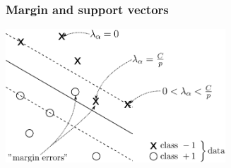 \begin{frame} \frametitle{Margin and support vectors}
	\begin{center} 
		\includegraphics[height=5cm]{img/section2_fig16_v2} 
	\end{center}
	
	
	\pause
	
	
	
\end{frame}

